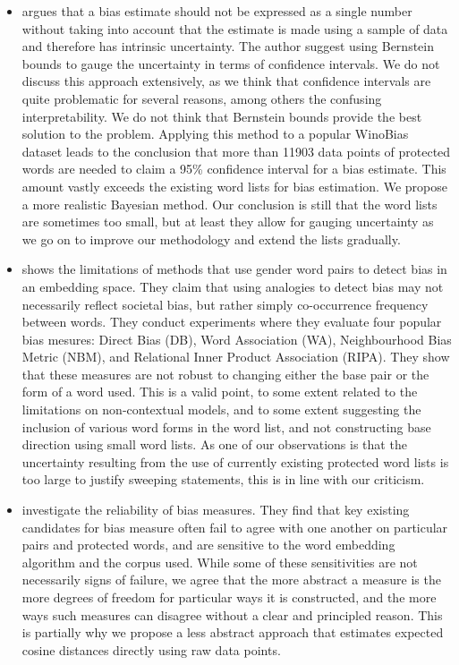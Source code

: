 \documentclass{clv3}
\begin{document}
\begin{itemize}
\item \citet{Ethayarajh2020Bernstein} argues that a bias estimate should not be expressed as a single number without taking into account that the estimate is
made using a sample of data and therefore has intrinsic uncertainty.
The author suggest using Bernstein bounds to gauge the uncertainty in
terms of confidence intervals. We do not discuss this approach
extensively, as we think that confidence intervals are quite
problematic for several reasons, among others the confusing
interpretability. We do not think that Bernstein bounds provide the
best solution to the problem. Applying this method to a popular
WinoBias dataset leads to the conclusion that more than 11903 data points of protected words 
are needed to claim a 95\% confidence interval for a bias estimate.
This amount vastly exceeds the existing word lists for bias
estimation. We propose a more realistic Bayesian method. Our
conclusion is still that the word lists are sometimes too small, but
at least they allow for gauging uncertainty as we go on to improve our
methodology and extend the lists gradually.



\item \citet{zhang2020robustness} shows the limitations of methods that use gender word pairs to detect bias in an embedding space. They claim that using analogies to detect bias may not necessarily reflect societal bias, but rather simply co-occurrence frequency between words. They conduct experiments where they evaluate four popular bias mesures: Direct Bias (DB), Word Association (WA), Neighbourhood Bias Metric (NBM), and Relational Inner Product Association (RIPA). They show that these measures are not robust to changing either the base pair or the form of a word used. This is  a valid point, to some extent related to the limitations on non-contextual models, and to some extent suggesting the inclusion of various word forms in the word list, and not constructing base direction using small word lists. As one of our observations is that the uncertainty resulting from the use of currently existing protected word lists is too large to justify sweeping statements, this is in line with our criticism. 


\item \citet{Du2021Assessing} investigate the reliability of bias measures. They find that key existing candidates for bias measure often fail to agree with one another on particular pairs and protected words, and are sensitive to the word embedding algorithm and the corpus used. While some of these sensitivities are not necessarily signs of failure, we agree that the more abstract a measure is the more degrees of freedom for particular ways it is constructed, and the more ways such measures can disagree without a clear and principled reason. This is partially why we propose a less abstract approach that estimates expected cosine distances directly using raw data points. 



\end{itemize}
\end{document}
